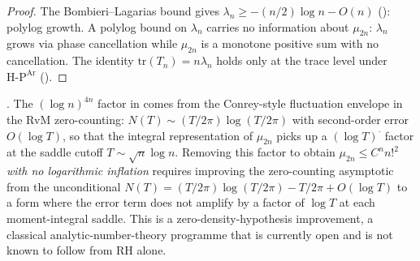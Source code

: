 \begin{proof}
The Bombieri--Lagarias bound gives
\(\lambda_{n}\geq-(n/2)\log n-O(n)\)
(): polylog growth. A polylog bound
on \(\lambda_{n}\) carries no information about \(\mu_{2n}\):
\(\lambda_{n}\) grows via phase cancellation while \(\mu_{2n}\) is a
monotone positive sum with no cancellation. The identity
\(\mathrm{tr}(T_{n})=n\lambda_{n}\) holds only at the trace level
under \(\mathrm{H\text{-}P}^{\mathrm{Ar}}\)
().
\end{proof}

\begin{proposition}
\label{v4-arith:r-audit:prop:closing-gap-is-density-RH}
\ClaimStatusProvedHere. The \((\log n)^{4n}\) factor in
 comes from the
Conrey-style fluctuation envelope in the RvM zero-counting:
\(N(T)\sim (T/2\pi)\log(T/2\pi)\) with second-order error
\(O(\log T)\), so that the integral representation of \(\mu_{2n}\)
picks up a \((\log T)^{\cdot}\) factor at the saddle cutoff
\(T\sim\sqrt{n}\log n\). Removing this factor to obtain
\(\mu_{2n}\leq C^{n}n!^{2}\) \emph{with no logarithmic inflation}
requires improving the zero-counting asymptotic from the
unconditional \(N(T)=(T/2\pi)\log(T/2\pi)-T/2\pi+O(\log T)\) to a
form where the error term does not amplify by a factor of \(\log T\)
at each moment-integral saddle. This is a zero-density-hypothesis
improvement, a classical analytic-number-theory programme that is
currently open and is not known to follow from RH alone.
\end{proposition}

